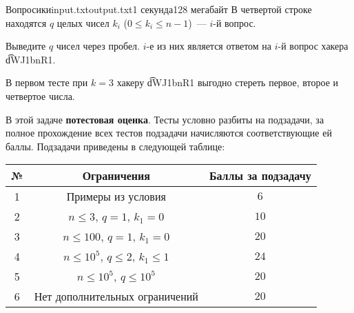\begin{problem}{Вопросики}{input.txt}{output.txt}{1 секунда}{128 мегабайт}
В четвертой строке находятся $q$ целых чисел $k_i$ ($0 \le k_i \le n- 1$)~--- $i$-й вопрос.

\OutputFile

Выведите $q$ чисел через пробел. $i$-е из них является ответом на $i$-й вопрос хакера \t{dWJ1bnR1}.

\Examples

\begin{example}
%
%
%
\end{example}

\Notes

В первом тесте при $k = 3$ хакеру \t{dWJ1bnR1} выгодно стереть первое, второе и четвертое числа.

\Scoring

В этой задаче \textbf{потестовая оценка}. Тесты условно разбиты на подзадачи, за полное прохождение всех тестов подзадачи начисляются соответствующие ей баллы. Подзадачи приведены в следующей таблице:

\medskip

\begin{tabular}{| c | c | c |} \hline
	№ & Ограничения & Баллы за подзадачу \\ \hline
	1 & Примеры из условия & $6$ \\ \hline
	2 & $n \le 3$, $q = 1$, $k_1 = 0$ & $10$ \\ \hline
	3 & $n \le 100$, $q = 1$, $k_1 = 0$ & $20$ \\ \hline
	4 & $n \le 10^5$, $q \le 2$, $k_1 \le 1$ & $24$ \\ \hline
	5 & $n \le 10^5$, $q \le 10^5$ & $20$ \\ \hline
	6 & Нет дополнительных ограничений & $20$ \\ \hline
\end{tabular}

\end{problem}

